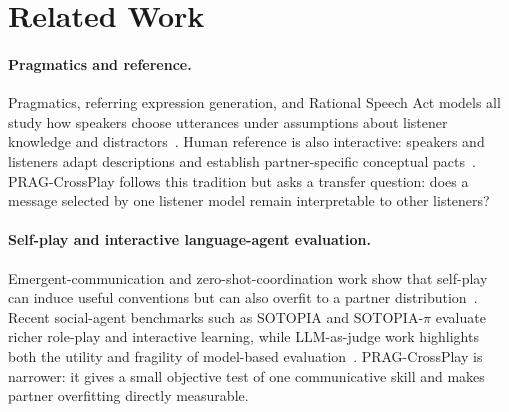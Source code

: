 \section{Related Work}

\paragraph{Pragmatics and reference.}
Pragmatics, referring expression generation, and Rational Speech Act models all study how speakers choose utterances under assumptions about listener knowledge and distractors~\cite{grice1975logic,dale1995computational,frank2012predicting,goodman2016pragmatic}. Human reference is also interactive: speakers and listeners adapt descriptions and establish partner-specific conceptual pacts~\cite{clark1986referring,brennan1996conceptual}. PRAG-CrossPlay follows this tradition but asks a transfer question: does a message selected by one listener model remain interpretable to other listeners?

\paragraph{Self-play and interactive language-agent evaluation.}
Emergent-communication and zero-shot-coordination work show that self-play can induce useful conventions but can also overfit to a partner distribution~\cite{foerster2016learning,lazaridou2017multiagent,carroll2019utility,hu2020otherplay,lucas2022anyplay}. Recent social-agent benchmarks such as SOTOPIA and SOTOPIA-$\pi$ evaluate richer role-play and interactive learning, while LLM-as-judge work highlights both the utility and fragility of model-based evaluation~\cite{zhou2023sotopia,wang2024sotopiapi,zheng2023judging}. PRAG-CrossPlay is narrower: it gives a small objective test of one communicative skill and makes partner overfitting directly measurable.
